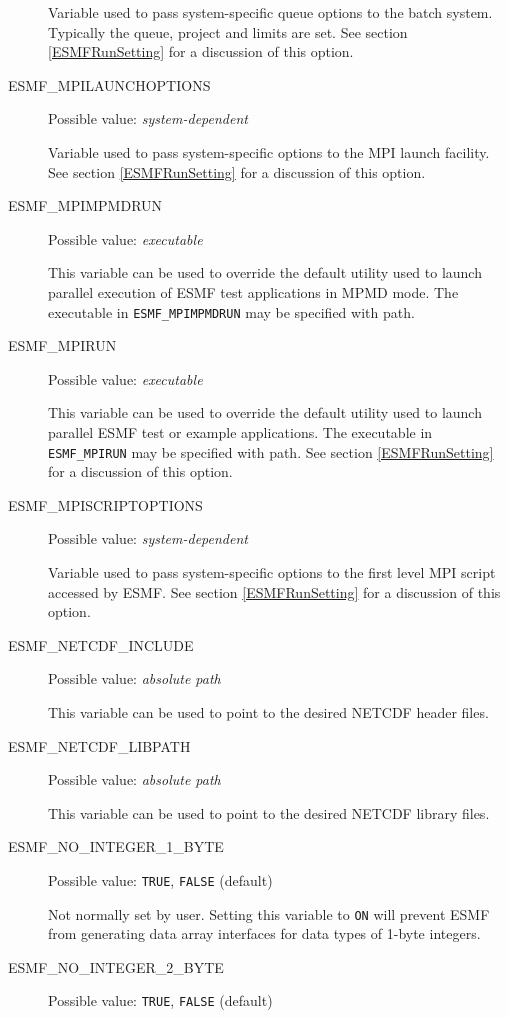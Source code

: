 \begin{description}
Variable used to pass system-specific queue options to the batch system. 
Typically the queue, project and limits are set.
See section \ref{ESMFRunSetting} for a discussion of this option.

\item[ESMF\_MPILAUNCHOPTIONS]
Possible value: {\em system-dependent}

Variable used to pass system-specific options to the MPI launch facility.
See section \ref{ESMFRunSetting} for a discussion of this option.

\item[ESMF\_MPIMPMDRUN]
Possible value: {\em executable}

This variable can be used to override the default utility used to launch
parallel execution of ESMF test applications in MPMD mode. The executable in
{\tt ESMF\_MPIMPMDRUN} may be specified with path.

\item[ESMF\_MPIRUN]
Possible value: {\em executable}

This variable can be used to override the default utility used to launch
parallel ESMF test or example applications. The executable in {\tt ESMF\_MPIRUN}
may be specified with path. 
See section \ref{ESMFRunSetting} for a discussion of this option.

\item[ESMF\_MPISCRIPTOPTIONS]
Possible value: {\em system-dependent}

Variable used to pass system-specific options to the first level MPI script
accessed by ESMF.
See section \ref{ESMFRunSetting} for a discussion of this option.

\item[ESMF\_NETCDF\_INCLUDE]
Possible value: {\em absolute path}

This variable can be used to point to the desired NETCDF header files.

\item[ESMF\_NETCDF\_LIBPATH]
Possible value: {\em absolute path}

This variable can be used to point to the desired NETCDF library files.

\item[ESMF\_NO\_INTEGER\_1\_BYTE]
Possible value: {\tt TRUE}, {\tt FALSE} (default)

Not normally set by user. Setting this variable to {\tt ON} will prevent ESMF
from generating data array interfaces for data types of 1-byte integers.

\item[ESMF\_NO\_INTEGER\_2\_BYTE] 
Possible value: {\tt TRUE}, {\tt FALSE} (default)


\end{description}

